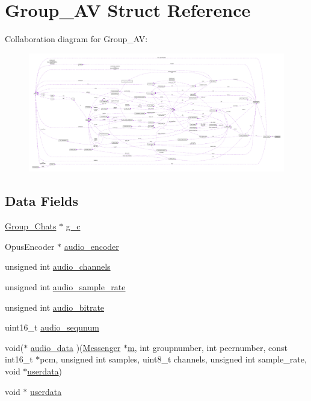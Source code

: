 \hypertarget{struct_group___a_v}{\section{Group\+\_\+\+A\+V Struct Reference}
\label{struct_group___a_v}
}


Collaboration diagram for Group\+\_\+\+A\+V\+:
\nopagebreak
\begin{figure}[H]
\begin{center}
\leavevmode
\includegraphics[width=350pt]{db/da7/struct_group___a_v__coll__graph}
\end{center}
\end{figure}
\subsection*{Data Fields}
\begin{DoxyCompactItemize}
\item 
\hyperlink{struct_group___chats}{Group\+\_\+\+Chats} $\ast$ \hyperlink{struct_group___a_v_a0220ceb497e4d7ffcbd301959cbfaf26}{g\+\_\+c}
\item 
Opus\+Encoder $\ast$ \hyperlink{struct_group___a_v_a8c1fa3d73f3426ba5cac83857c390ebc}{audio\+\_\+encoder}
\item 
unsigned int \hyperlink{struct_group___a_v_a7b6aa0a517a158485dccd6ce0a916e0e}{audio\+\_\+channels}
\item 
unsigned int \hyperlink{struct_group___a_v_a0562d75f5e3bb5cce19ab1eae44fdaac}{audio\+\_\+sample\+\_\+rate}
\item 
unsigned int \hyperlink{struct_group___a_v_a1e39921527f07befd08d913c63b397a9}{audio\+\_\+bitrate}
\item 
uint16\+\_\+t \hyperlink{struct_group___a_v_a4e6b863a96b5fadfc86cc2ef353c76db}{audio\+\_\+sequnum}
\item 
void($\ast$ \hyperlink{struct_group___a_v_a2ae2d081bbdd51062bcb82ea4a55eec5}{audio\+\_\+data} )(\hyperlink{struct_messenger}{Messenger} $\ast$\hyperlink{_messenger__test_8c_aea6eb6c7c30a659f1b0dee83eaf03ea2}{m}, int groupnumber, int peernumber, const int16\+\_\+t $\ast$pcm, unsigned int samples, uint8\+\_\+t channels, unsigned int sample\+\_\+rate, void $\ast$\hyperlink{struct_group___a_v_afd0ffb02780e738d4c0a10ab833b7834}{userdata})
\item 
void $\ast$ \hyperlink{struct_group___a_v_afd0ffb02780e738d4c0a10ab833b7834}{userdata}
\end{DoxyCompactItemize}


